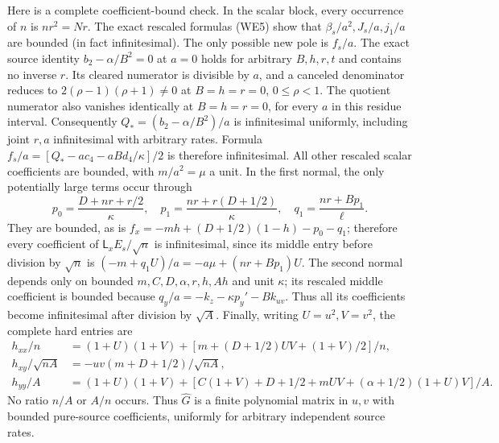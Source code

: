 Here is a complete coefficient-bound check. In the scalar block,
every occurrence of $n$ is $nr^2=Nr$. The exact rescaled formulas
(WE5) show that $\beta_s/a^2,J_s/a,j_1/a$ are bounded (in fact
infinitesimal). The only possible new pole is $f_s/a$.
The exact source identity $b_2-\alpha/B^2=0$ at $a=0$ holds
for arbitrary $B,h,r,t$ and contains no inverse $r$.
Its cleared numerator is divisible by $a$, and a canceled
denominator reduces to $2(\rho-1)(\rho+1)\ne0$ at
$B=h=r=0$, $0\le\rho<1$.
The quotient numerator also vanishes identically at $B=h=r=0$,
for every $a$ in this residue interval. Consequently
$Q_*=(b_2-\alpha/B^2)/a$ is infinitesimal uniformly,
including joint $r,a$ infinitesimal with arbitrary rates. Formula
$f_s/a=[Q_*-ac_4-aBd_4/\kappa]/2$ is therefore infinitesimal.
All other rescaled scalar coefficients are bounded, with
$m/a^2=\mu$ a unit. In the first normal, the only
potentially large terms occur through
\[
 p_0=\frac{D+nr+r/2}{\kappa},\quad
 p_1=\frac{nr+r(D+1/2)}{\kappa},\quad
 q_1=\frac{nr+Bp_1}{\ell}.
\]
They are bounded, as is
$f_x=-mh+(D+1/2)(1-h)-p_0-q_1$; therefore every coefficient
of $\mathsf L_x E_s/\sqrt n$ is infinitesimal, since its
middle entry before division by $\sqrt n$ is
$(-m+q_1U)/a=-a\mu+(nr+Bp_1)U$.
The second normal depends only on bounded $m,C,D,\alpha,r,h,Ah$
and unit $\kappa$; its rescaled middle coefficient is bounded
because $q_y/a=-k_z-\kappa p_y'-Bk_{uv}$. Thus all its
coefficients become infinitesimal after division by $\sqrt A$.
Finally, writing
$U=u^2,V=v^2$, the complete hard entries are
\[
\begin{split}
 h_{xx}/n&=(1+U)(1+V)
        +[m+(D+1/2)UV+(1+V)/2]/n,\\
 h_{xy}/\sqrt{nA}&=-uv(m+D+1/2)/\sqrt{nA},\\
 h_{yy}/A&=(1+U)(1+V)
 +[C(1+V)+D+1/2+mUV+(\alpha+1/2)(1+U)V]/A.
\end{split}                                            \tag{SL4}
\]
No ratio $n/A$ or $A/n$ occurs. Thus $\widehat G$ is a finite
polynomial matrix in $u,v$ with bounded pure-source coefficients,
uniformly for arbitrary independent source rates.

